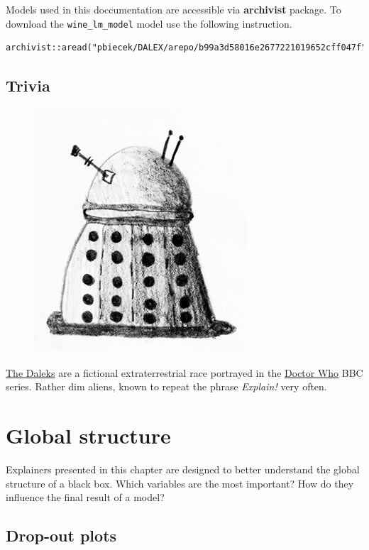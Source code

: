 \documentclass[]{book}
\theoremstyle{definition}
\theoremstyle{definition}
\theoremstyle{definition}
\theoremstyle{remark}
\begin{document}
Models used in this doccumentation are accessible via \textbf{archivist}
package. To download the \texttt{wine\_lm\_model} model use the
following instruction.

\begin{verbatim}
archivist::aread("pbiecek/DALEX/arepo/b99a3d58016e2677221019652cff047f")
\end{verbatim}

\section{Trivia}\label{trivia}

\begin{figure}
\centering
\includegraphics{images/dalex01small.jpg}
\caption{}
\end{figure}

\href{https://en.wikipedia.org/wiki/Dalek}{The Daleks} are a fictional
extraterrestrial race portrayed in the
\href{https://en.wikipedia.org/wiki/Doctor_Who}{Doctor Who} BBC series.
Rather dim aliens, known to repeat the phrase \emph{Explain!} very
often.

\chapter{Global structure}\label{global-structure}

Explainers presented in this chapter are designed to better understand
the global structure of a black box. Which variables are the most
important? How do they influence the final result of a model?

\section{Drop-out plots}\label{drop-out-plots}
\end{document}
